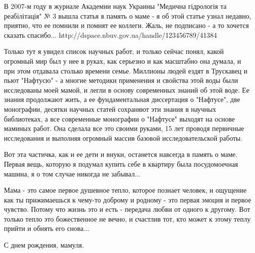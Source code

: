 В 2007-м году в журнале Академии наук Украины "Медична гідрологія та
реабілітація" № 3 вышла статья в память о маме - я об этой статье узнал
недавно, приятно, что ее помнили и помнят ее коллеги. Жаль, не подписано - а то
хочется сказать спасибо... http://dspace.nbuv.gov.ua/handle/123456789/41384

Только тут я увидел список научных работ, и только сейчас понял, какой огромный
мир был у нее в руках, как серьезно и как масштабно она думала, и при этом
отдавала столько времени семье. Миллионы людей ездят в Трускавец и пьют
"Нафтусю" - а многие методики применения и свойства этой воды были исследованы
моей мамой, и легли в основу современных знаний об этой воде. Ее знания
продолжают жить, а ее фундаментальная диссертация о "Нафтусе", две монографии,
десятки научных статей сохраняют эти знания в научных библиотеках, а все
современные монографии о "Нафтусе" выходят на основе маминых работ. Она сделала
все это своими руками, 15 лет проводя первичные исследования и выполняя
огромный массив базовой исследовательской работы.

Вот эта частичка, как и ее дети и внуки, останется навсегда в память о маме.
Первая вещь, которую я подумал купить себе в квартиру была посудомоечная
машина, я о том случае никогда не забывал...

Мама - это самое первое душевное тепло, которое познает человек, и ощущение как
ты прижимаешься к чему-то доброму и родному - это первая эмоция и первое
чувство. Потому что жизнь это и есть - передача любви от одного к другому. Вот
только тепло это божественное не вечно, и счастлив тот, кто может к этому теплу
прийти и обнять его снова... 

С днем рождения, мамуля.
